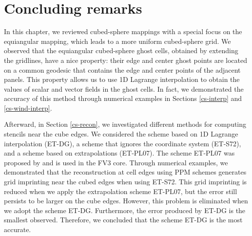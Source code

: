 \section{Concluding remarks}
\label{cs-conc}
In this chapter, we reviewed cubed-sphere mappings with a special focus on the equiangular mapping,
which leads to a more uniform cubed-sphere grid. We observed that the equiangular cubed-sphere ghost cells,
obtained by extending the gridlines, have a nice property: their edge and center ghost points are located on a common geodesic
that contains the edge and center points of the adjacent panels. 
This property allows us to use 1D Lagrange interpolation to obtain the values of scalar and vector fields in the ghost cells. 
In fact, we demonstrated the accuracy of this method through numerical examples in Sections \ref{cs-interp} and \ref{cs-wind-interp}.
 
Afterward, in Section \ref{cs-recon}, we investigated different methods for computing stencils near the cube edges.
We considered the scheme based on 1D Lagrange interpolation (ET-DG), a scheme that ignores the coordinate system (ET-S72),
and a scheme based on extrapolations (ET-PL07). The scheme ET-PL07 was proposed by \citet{putman:2007} and is used in the FV3 core.
Through numerical examples, we demonstrated that the reconstruction at cell edges using PPM schemes generates grid imprinting near
the cubed edges when using ET-S72. This grid imprinting is reduced when we apply the extrapolation scheme ET-PL07, 
but the error still persists to be larger on the cube edges. However, this problem is eliminated when we adopt the scheme ET-DG.
Furthermore, the error produced by ET-DG is the smallest observed. Therefore, we concluded that the scheme ET-DG is the most accurate.

